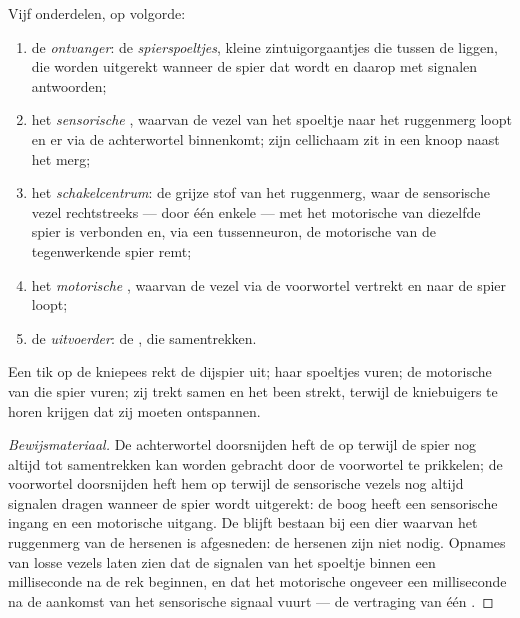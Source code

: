 \begin{proposition}\label{prop:g12:stretch-reflex:arc}
Vijf onderdelen, op volgorde:
\begin{enumerate}
  \item de \emph{ontvanger}: de \emph{spierspoeltjes}, kleine
        zintuigorgaantjes die tussen de  liggen, die worden
        uitgerekt wanneer de spier dat wordt en daarop met signalen
        antwoorden;
  \item het \emph{sensorische }, waarvan de vezel van het spoeltje
        naar het ruggenmerg loopt en er via de achterwortel binnenkomt;
        zijn cellichaam zit in een knoop naast het merg;
  \item het \emph{schakelcentrum}: de grijze stof van het ruggenmerg,
        waar de sensorische vezel rechtstreeks --- door één enkele 
        --- met het motorische  van diezelfde spier is verbonden
        en, via een tussenneuron, de motorische  van de
        tegenwerkende spier remt;
  \item het \emph{motorische }, waarvan de vezel via de voorwortel
        vertrekt en naar de spier loopt;
  \item de \emph{uitvoerder}: de , die samentrekken.
\end{enumerate}
Een tik op de kniepees rekt de dijspier uit; haar spoeltjes vuren; de
motorische  van die spier vuren; zij trekt samen en het been
strekt, terwijl de kniebuigers te horen krijgen dat zij moeten ontspannen.
\end{proposition}
\begin{proof}[Bewijsmateriaal]
De achterwortel doorsnijden heft de  op terwijl de spier nog altijd
tot samentrekken kan worden gebracht door de voorwortel te prikkelen; de
voorwortel doorsnijden heft hem op terwijl de sensorische vezels nog
altijd signalen dragen wanneer de spier wordt uitgerekt: de boog heeft een
sensorische ingang en een motorische uitgang. De  blijft bestaan bij
een dier waarvan het ruggenmerg van de hersenen is afgesneden: de hersenen
zijn niet nodig. Opnames van losse vezels laten zien dat de signalen van
het spoeltje binnen een milliseconde na de rek beginnen, en dat het
motorische  ongeveer een milliseconde na de aankomst van het
sensorische signaal vuurt --- de vertraging van één .
\end{proof}

